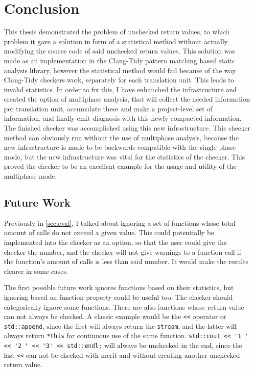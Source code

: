 
\chapter{Conclusion}
\label{ch:sum}

This thesis demonstrated the problem of unchecked return values, to which problem it gave a solution in form of a statistical method without
actually modifying the source code of said unchecked return values. This solution was made as an implementation in the Clang-Tidy pattern
matching based static analysis library, however the statistical method would fail because of the way Clang-Tidy checkers work, separately
for each translation unit. This leads to invalid statistics. In order to fix this, I have enhanched the infrastructure and created the
option of multiphase analysis, that will collect the needed information per translation unit, accumulate these and make a project-level set
of information, and finally emit diagnosis with this newly compacted information. The finished checker was accomplished using this new
infrastructure. This checker method can obviously run without the use of multiphase analysis, because the new infrastructure is made to be
backwards compatible with the single phase mode, but the new infrastructure was vital for the statistics of the checker. This proved the
checker to be an excellent example for the usage and utility of the multiphase mode.

\section{Future Work}

Previously in \cref{sec:eval}, I talked about ignoring a set of functions whose total amount of calls do not exceed a given value. This could
potentially be implemented into the checker as an option, so that the user could give the checker the number, and the checker will not give
warnings to a function call if the function's amount of calls is less than said number. It would make the results clearer in some cases.

The first possible future work ignores functions based on their statistics, but ignoring based on function property could be useful too.
The checker should categorically ignore some functions. There are also functions whose return value can not always be checked. A classic
example would be the \lstinline{<<} operator or \lstinline{std::append}, since the first will always return the \texttt{stream}, and the latter
will always return \lstinline{*this} for continuous use of the same function. \lstinline{std::cout << '1 ' << '2 ' << '3' << std::endl;} will
always be unchecked in the end, since the last \lstinline{<<} can not be checked with merit and without creating another unchecked return value.

